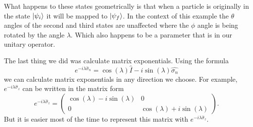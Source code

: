 \documentclass[twocolumn]{article}
\begin{document}
What happens to these states geometrically is that when a particle is originally in the state $\ket{\psi_i}$ it will be mapped to $\ket{\psi_f}$. In the context of this example the $\theta$ angles of the second and third states are unaffected where the $\phi$ angle is being rotated by the angle $\lambda$. Which also happens to be a parameter that is in our unitary operator.

The last thing we did was calculate matrix exponentials. Using the formula
\begin{equation}\label{eq:24}
e^{-i\lambda\hat{\sigma}_n}=\cos{(\lambda)}\hat{I}-i\sin{(\lambda)}\hat{\sigma_n}
\end{equation}
we can calculate matrix exponentials in any direction we choose. For example, $e^{-i\lambda\hat{\sigma}_z}$ can be written in the matrix form
\begin{equation}\label{eq:25}
e^{-i\lambda\hat{\sigma}_z}=
\begin{pmatrix}
\cos{(\lambda)}-i\sin{(\lambda)} & 0 \\
0 & \cos{(\lambda)}+i\sin{(\lambda)}
\end{pmatrix}.
\end{equation}
But it is easier most of the time to represent this matrix with $e^{-i\lambda\hat{\sigma}_z}$.
\end{document}

